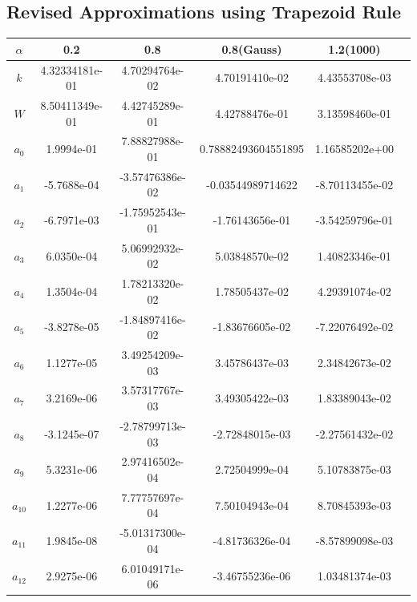 \documentclass[10pt,a4paper,final]{report}
\begin{document}
\subsection{Revised Approximations using Trapezoid Rule}
\begin{tabular}{|c|c|c|c|c|c|}
\hline
\rule[-1ex]{0pt}{2.5ex} $\alpha$ & 0.2 & 0.8 & 0.8(Gauss) & 1.2(1000) \\ 
\hline 
\rule[-1ex]{0pt}{2.5ex} $k$ &  4.32334181e-01 & 4.70294764e-02 &  4.70191410e-02 & 4.43553708e-03 \\ 
\hline
\rule[-1ex]{0pt}{2.5ex} $W$ & 8.50411349e-01 & 4.42745289e-01  & 4.42788476e-01 & 3.13598460e-01 \\ 
\hline
\rule[-1ex]{0pt}{2.5ex} $a_0$ & 1.9994e-01 & 7.88827988e-01  & 0.78882493604551895 & 1.16585202e+00 \\ 
\hline
\rule[-1ex]{0pt}{2.5ex} $a_1$ & -5.7688e-04 & -3.57476386e-02  & -0.03544989714622 &  -8.70113455e-02 \\
\hline 
\rule[-1ex]{0pt}{2.5ex} $a_2$ & -6.7971e-03 & -1.75952543e-01   &  -1.76143656e-01 &  -3.54259796e-01  \\ 
\hline 
\rule[-1ex]{0pt}{2.5ex} $a_3$ & 6.0350e-04 &  5.06992932e-02   & 5.03848570e-02 & 1.40823346e-01 \\ 
\hline 
\rule[-1ex]{0pt}{2.5ex} $a_4$ & 1.3504e-04 &   1.78213320e-02  & 1.78505437e-02 &  4.29391074e-02\\ 
\hline 
\rule[-1ex]{0pt}{2.5ex} $a_5$ & -3.8278e-05 &  -1.84897416e-02 & -1.83676605e-02 & -7.22076492e-02 \\ 
\hline 
\rule[-1ex]{0pt}{2.5ex} $a_6$ &  1.1277e-05  &  3.49254209e-03  &  3.45786437e-03 & 2.34842673e-02 \\ 
\hline 
\rule[-1ex]{0pt}{2.5ex} $a_7$ & 3.2169e-06 & 3.57317767e-03   & 3.49305422e-03  & 1.83389043e-02  \\ 
\hline 
\rule[-1ex]{0pt}{2.5ex} $a_8$ & -3.1245e-07  & -2.78799713e-03   & -2.72848015e-03 &  -2.27561432e-02  \\ 
\hline 
\rule[-1ex]{0pt}{2.5ex} $a_9$ & 5.3231e-06 &  2.97416502e-04  & 2.72504999e-04 & 5.10783875e-03\\ 
\hline 
\rule[-1ex]{0pt}{2.5ex} $a_{10}$ & 1.2277e-06 & 7.77757697e-04  & 7.50104943e-04  & 8.70845393e-03  \\ 
\hline 
\rule[-1ex]{0pt}{2.5ex} $a_{11}$ & 1.9845e-08 & -5.01317300e-04 & -4.81736326e-04 & -8.57899098e-03 \\ 
\hline 
\rule[-1ex]{0pt}{2.5ex} $a_{12}$ & 2.9275e-06  &   6.01049171e-06    & -3.46755236e-06 & 1.03481374e-03 \\ 

\end{tabular}
\end{document}
